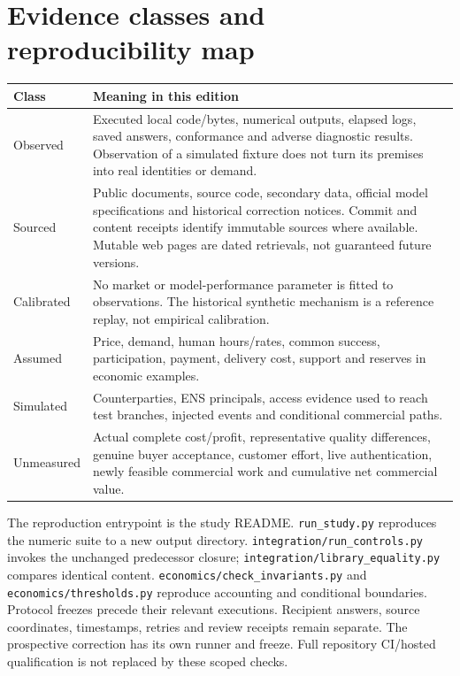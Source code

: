 \documentclass[11pt]{article}
\begin{document}
\section{Evidence classes and reproducibility map}

\begin{longtable}{>{\raggedright\arraybackslash}p{}p{}}
\toprule
Class & Meaning in this edition\\
\midrule\endhead
Observed & Executed local code/bytes, numerical outputs, elapsed logs, saved answers, conformance and adverse diagnostic results. Observation of a simulated fixture does not turn its premises into real identities or demand.\\
Sourced & Public documents, source code, secondary data, official model specifications and historical correction notices. Commit and content receipts identify immutable sources where available. Mutable web pages are dated retrievals, not guaranteed future versions.\\
Calibrated & No market or model-performance parameter is fitted to observations. The historical synthetic mechanism is a reference replay, not empirical calibration.\\
Assumed & Price, demand, human hours/rates, common success, participation, payment, delivery cost, support and reserves in economic examples.\\
Simulated & Counterparties, ENS principals, access evidence used to reach test branches, injected events and conditional commercial paths.\\
Unmeasured & Actual complete cost/profit, representative quality differences, genuine buyer acceptance, customer effort, live authentication, newly feasible commercial work and cumulative net commercial value.\\
\bottomrule
\end{longtable}

The reproduction entrypoint is the study README. \texttt{run\_study.py} reproduces the numeric suite to a new output directory. \texttt{integration/run\_controls.py} invokes the unchanged predecessor closure; \texttt{integration/library\_equality.py} compares identical content. \texttt{economics/check\_invariants.py} and \texttt{economics/thresholds.py} reproduce accounting and conditional boundaries. Protocol freezes precede their relevant executions. Recipient answers, source coordinates, timestamps, retries and review receipts remain separate. The prospective correction has its own runner and freeze. Full repository CI/hosted qualification is not replaced by these scoped checks.
\end{document}
